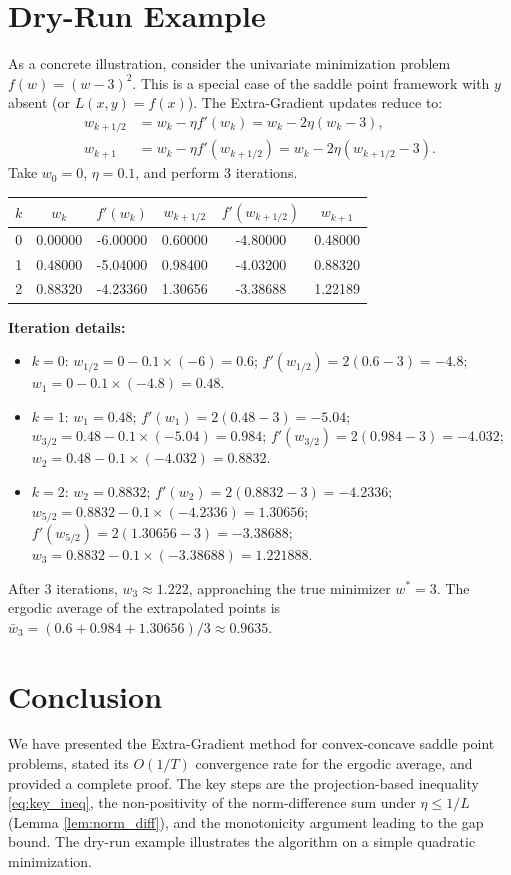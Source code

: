 \documentclass{article}
\theoremstyle{plain}
\theoremstyle{definition}
\begin{document}
\section{Dry-Run Example}
As a concrete illustration, consider the univariate minimization problem $f(w) = (w-3)^2$. This is a special case of the saddle point framework with $y$ absent (or $L(x,y)=f(x)$). The Extra-Gradient updates reduce to:
\begin{align*}
w_{k+1/2} &= w_k - \eta f'(w_k) = w_k - 2\eta (w_k - 3), \\
w_{k+1} &= w_k - \eta f'(w_{k+1/2}) = w_k - 2\eta (w_{k+1/2} - 3).
\end{align*}
Take $w_0 = 0$, $\eta = 0.1$, and perform 3 iterations.

\begin{center}
\begin{tabular}{c c c c c c}
\toprule
$k$ & $w_k$ & $f'(w_k)$ & $w_{k+1/2}$ & $f'(w_{k+1/2})$ & $w_{k+1}$ \\
\midrule
0 & 0.00000 & -6.00000 & 0.60000 & -4.80000 & 0.48000 \\
1 & 0.48000 & -5.04000 & 0.98400 & -4.03200 & 0.88320 \\
2 & 0.88320 & -4.23360 & 1.30656 & -3.38688 & 1.22189 \\
\bottomrule
\end{tabular}
\end{center}

\textbf{Iteration details:}
\begin{itemize}
\item $k=0$: $w_{1/2} = 0 - 0.1 \times (-6) = 0.6$; $f'(w_{1/2}) = 2(0.6-3) = -4.8$; $w_1 = 0 - 0.1 \times (-4.8) = 0.48$.
\item $k=1$: $w_1 = 0.48$; $f'(w_1) = 2(0.48-3) = -5.04$; $w_{3/2} = 0.48 - 0.1 \times (-5.04) = 0.984$; $f'(w_{3/2}) = 2(0.984-3) = -4.032$; $w_2 = 0.48 - 0.1 \times (-4.032) = 0.8832$.
\item $k=2$: $w_2 = 0.8832$; $f'(w_2) = 2(0.8832-3) = -4.2336$; $w_{5/2} = 0.8832 - 0.1 \times (-4.2336) = 1.30656$; $f'(w_{5/2}) = 2(1.30656-3) = -3.38688$; $w_3 = 0.8832 - 0.1 \times (-3.38688) = 1.221888$.
\end{itemize}
After 3 iterations, $w_3 \approx 1.222$, approaching the true minimizer $w^*=3$. The ergodic average of the extrapolated points is $\bar{w}_3 = (0.6 + 0.984 + 1.30656)/3 \approx 0.9635$.

\section{Conclusion}
We have presented the Extra-Gradient method for convex-concave saddle point problems, stated its $O(1/T)$ convergence rate for the ergodic average, and provided a complete proof. The key steps are the projection-based inequality \eqref{eq:key_ineq}, the non-positivity of the norm-difference sum under $\eta \le 1/L$ (Lemma \ref{lem:norm_diff}), and the monotonicity argument leading to the gap bound. The dry-run example illustrates the algorithm on a simple quadratic minimization.
\end{document}
